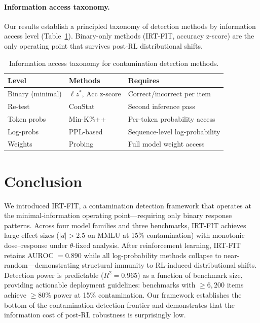 \documentclass[11pt,a4paper]{article}
\begin{document}
\paragraph{Information access taxonomy.}
Our results establish a principled taxonomy of detection methods by information access level (Table~\ref{tab:info-taxonomy}).
Binary-only methods (IRT-FIT, accuracy z-score) are the only operating point that survives post-RL distributional shifts.

\begin{table}[h]
\centering
\caption{Information access taxonomy for contamination detection methods.}
\label{tab:info-taxonomy}
\begin{tabular}{lll}
\toprule
\textbf{Level} & \textbf{Methods} & \textbf{Requires} \\
\midrule
Binary (minimal) & $\ell z^*$, Acc z-score & Correct/incorrect per item \\
Re-test          & ConStat               & Second inference pass \\
Token probs      & Min-K\%++             & Per-token probability access \\
Log-probs        & PPL-based             & Sequence-level log-probability \\
Weights          & Probing               & Full model weight access \\
\bottomrule
\end{tabular}
\end{table}


\section{Conclusion}

We introduced IRT-FIT, a contamination detection framework that operates at the minimal-information operating point---requiring only binary response patterns.
Across four model families and three benchmarks, IRT-FIT achieves large effect sizes ($|d| > 2.5$ on MMLU at 15\% contamination) with monotonic dose--response under $\theta$-fixed analysis.
After reinforcement learning, IRT-FIT retains AUROC $= 0.890$ while all log-probability methods collapse to near-random---demonstrating structural immunity to RL-induced distributional shifts.
Detection power is predictable ($R^2 = 0.965$) as a function of benchmark size, providing actionable deployment guidelines: benchmarks with $\geq 6{,}200$ items achieve $\geq 80\%$ power at 15\% contamination.
Our framework establishes the bottom of the contamination detection frontier and demonstrates that the information cost of post-RL robustness is surprisingly low.
\end{document}
